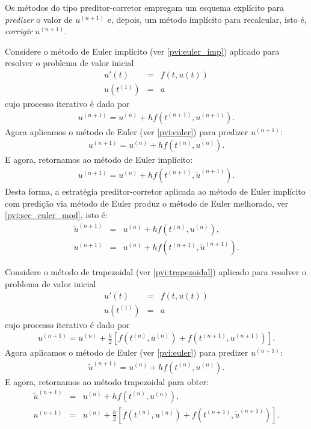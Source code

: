 Os métodos do tipo preditor-corretor empregam um esquema explícito para \emph{predizer} o valor de $u^{(n+1)}$ e, depois, um método implícito para recalcular, isto é, \emph{corrigir} $u^{(n+1)}$.

\begin{ex} Considere o método de Euler implícito (ver \ref{pvi:euler_imp}) aplicado para resolver  o problema de valor inicial
\begin{eqnarray*}
  u'(t)  &=& f(t,u(t)) \\
  u(t^{(1)}) &=& a
\end{eqnarray*}
cujo processo iterativo é dado por
\begin{eqnarray*}
u^{(n+1)}=u^{(n)} + h f(t^{(n+1)},u^{(n+1)}).
\end{eqnarray*}
Agora aplicamos o método de Euler (ver \ref{pvi:euler}) para predizer $u^{(n+1)}$:
\begin{eqnarray*}
u^{(n+1)}=u^{(n)} + h f(t^{(n)},u^{(n)}).
\end{eqnarray*}
E agora, retornamos ao método de Euler implícito:
\begin{eqnarray*}
u^{(n+1)}=u^{(n)} + h f(t^{(n+1)},\tilde{u}^{(n+1)}).
\end{eqnarray*}
Desta forma, a estratégia preditor-corretor aplicada ao método de Euler implícito com predição via método de Euler produz o método de Euler melhorado, ver \ref{pvi:sec_euler_mod}, isto é:
\begin{eqnarray*}
\tilde{u}^{(n+1)}&=&u^{(n)} + h f(t^{(n)},u^{(n)}),\\
u^{(n+1)}&=&u^{(n)} + h f(t^{(n+1)},\tilde{u}^{(n+1)}).
\end{eqnarray*}
\end{ex}


\begin{ex} Considere o método de trapezoidal (ver \ref{pvi:trapezoidal}) aplicado para resolver o problema de valor inicial
\begin{eqnarray*}
  u'(t)  &=& f(t,u(t)) \\
  u(t^{(1)}) &=& a
\end{eqnarray*}
cujo processo iterativo é dado por
\begin{eqnarray*}
u^{(n+1)}=u^{(n)} + \frac{h}{2} \left[f(t^{(n)},u^{(n)})+f(t^{(n+1)},u^{(n+1)})\right].
\end{eqnarray*}
Agora aplicamos o método de Euler (ver \ref{pvi:euler}) para predizer $u^{(n+1)}$:
\begin{eqnarray*}
\tilde{u}^{(n+1)}=u^{(n)} + h f(t^{(n)},u^{(n)}).
\end{eqnarray*}
E agora, retornamos ao método trapezoidal para obter:
\begin{eqnarray*}
\tilde{u}^{(n+1)}&=&u^{(n)} + h f(t^{(n)},u^{(n)}),\\
u^{(n+1)}&=&u^{(n)} + \frac{h}{2} \left[f(t^{(n)},u^{(n)})+f(t^{(n+1)},\tilde{u}^{(n+1)})\right].
\end{eqnarray*}
\end{ex}

